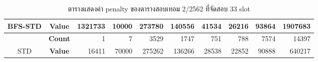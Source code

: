 \begin{table}[]
{\begin{tabular}{@{}ccrrrrrrrr@{}}
    \multirow{-2}{*}{BFS-STD}                    & \textbf{Value}                        & 1321733                        & 10000                          & 273780                         & 140556                         & 41534                          & 26216                          & 93864                          & 1907683                          \\ \midrule
                                                  & {\textbf{Count}} & {1}       & {7}       & {3529}    & {1747}    & {751}     & {788}     & {7574}    & {14397}     \\ \cmidrule(l){2-10} 
    \multirow{-2}{*}{STD} & {\textbf{Value}} & {16411}   & {70000}   & {275262}  & {136266}  & {28538}   & {22852}   & {90888}   & {640217}    \\ \bottomrule
    \end{tabular}%
    }
    \caption{ตารางแสดงค่า penalty ของตารางสอบเทอม 2/2562 ที่จัดสอบ 33 slot}
    \label{tab:result_table_262_33}
\end{table}
